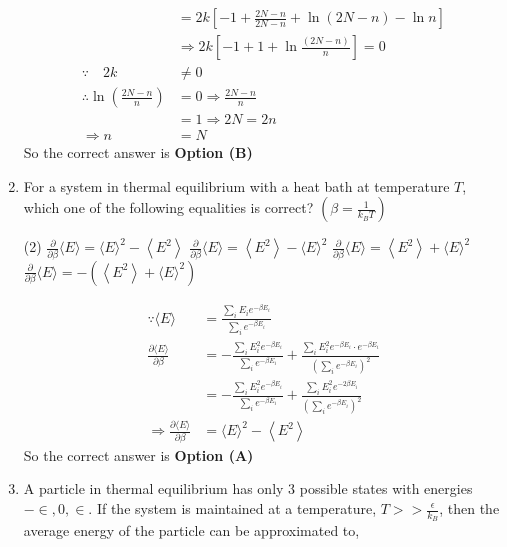 \begin{enumerate}
\begin{answer}
\begin{align*}
		&=2 k\left[-1+\frac{2 N-n}{2 N-n}+\ln (2 N-n)-\ln n\right]\\& \Rightarrow 2 k\left[-1+1+\ln \frac{(2 N-n)}{n}\right]=0\\
		\because \quad 2 k &\neq 0\\
		\therefore \ln \left(\frac{2 N-n}{n}\right)&=0 \Rightarrow \frac{2 N-n}{n}\\&=1 \Rightarrow 2 N=2 n \\
		\Rightarrow n&=N
		\end{align*}
		So the correct answer is \textbf{Option (B)}
	\end{answer}	
	\item For a system in thermal equilibrium with a heat bath at temperature $T$, which one of the following equalities is correct? $\left(\beta=\frac{1}{k_{B} T}\right)$
	{}
	\begin{tasks}(2)
		\task[\textbf{A.}] $\frac{\partial}{\partial \beta}\langle E\rangle=\langle E\rangle^{2}-\left\langle E^{2}\right\rangle$
		\task[\textbf{B.}] $\frac{\partial}{\partial \beta}\langle E\rangle=\left\langle E^{2}\right\rangle-\langle E\rangle^{2}$
		\task[\textbf{C.}] $\frac{\partial}{\partial \beta}\langle E\rangle=\left\langle E^{2}\right\rangle+\langle E\rangle^{2}$
		\task[\textbf{D.}] $\frac{\partial}{\partial \beta}\langle E\rangle=-\left(\left\langle E^{2}\right\rangle+\langle E\rangle^{2}\right)$
	\end{tasks}
	\begin{answer}
		\begin{align*}
		\because\langle E\rangle&=\frac{\sum_{i} E_{i} e^{-\beta E_{i}}}{\sum_{i} e^{-\beta E_{i}}}\\
		\frac{\partial\langle E\rangle}{\partial \beta}&=-\frac{\sum_{i} E_{i}^{2} e^{-\beta E_{i}}}{\sum_{i} e^{-\beta E_{i}}}+\frac{\sum_{i} E_{i}^{2} e^{-\beta E_{i}} \cdot e^{-\beta E_{i}}}{\left(\sum_{i} e^{-\beta E_{i}}\right)^{2}}\\&=-\frac{\sum_{i} E_{i}^{2} e^{-\beta E_{i}}}{\sum_{i} e^{-\beta E_{i}}}+\frac{\sum_{i} E_{i}^{2} e^{-2 \beta E_{i}}}{\left(\sum_{i} e^{-\beta E_{i}}\right)^{2}}\\
		\Rightarrow \frac{\partial\langle E\rangle}{\partial \beta}&=\langle E\rangle^{2}-\left\langle E^{2}\right\rangle
		\end{align*}
		So the correct answer is \textbf{Option (A)}
	\end{answer}	
	\item A particle in thermal equilibrium has only 3 possible states with energies $-\in, 0, \in .$ If the system is maintained at a temperature, $T>>\frac{\epsilon}{k_{B}}$, then the average energy of the particle can be approximated to,

\end{enumerate}
